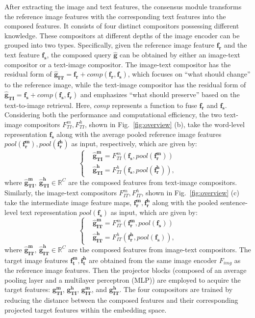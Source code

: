 \documentclass[sigconf]{acmart}
\begin{document}
After extracting the image and text features, the consensus module transforms the reference image features with the corresponding text features into the composed features. It consists of four distinct compositors possessing different knowledge. These compositors at different depths of the image encoder can be grouped into two types. Specifically, given the reference image feature $\bm{f_r}$ and the text feature $\bm{f_s}$, the composed query $\bm{\hat{g}}$ can be obtained by either an image-text compositor or a text-image compositor. The image-text compositor has the residual form of $\bm{\hat{g}_{IT}} = \bm{f_r} + comp(\bm{f_r},\bm{f_s})$, which focuses on ``what should change'' to the reference image, while the text-image compositor has the residual form of $\bm{\hat{g}_{TI}} = \bm{f_s} + comp(\bm{f_s},\bm{f_r})$ and emphasizes ``what should preserve'' based on the text-to-image retrieval. Here, $comp$ represents a function to fuse $\bm{f_r}$ and $\bm{f_s}$. Considering both the performance and computational efficiency, the two text-image compositors $F_{TI}^{m}, F_{TI}^{h}$, shown in Fig.~\ref{fig:overview} (b), take the word-level representation $\bm{f_s}$ along with the average pooled reference image features $pool(\bm{f^m_r}), pool(\bm{f^h_r})$ as input, respectively, which are given by:
\begin{equation}
\label{eq:text_comp}
    \begin{cases}
    &\bm{\hat{g}^m_{TI}} = F_{TI}^{m}(\bm{f_s}, pool(\bm{f^m_r})) \\
    &\bm{\hat{g}^h_{TI}} = F_{TI}^{h}(\bm{f_s}, pool(\bm{f^h_r})),
    \end{cases}
\end{equation}
where $\bm{\hat{g}^m_{TI}},~\bm{\hat{g}^h_{TI}}\in\mathbb{R}^C$ are the composed features from text-image compositors. Similarly, the image-text compositors $F_{IT}^m, F_{IT}^h$, shown in Fig.~\ref{fig:overview} (c) take the intermediate image feature maps, $\bm{f_r^m}, \bm{f_r^h}$ along with the pooled sentence-level text representation $pool(\bm{f_s})$ as input, which are given by:
\begin{equation}
\label{eq:img_comp}
    \begin{cases}
    &\bm{\hat{g}_{IT}^m} = F_{IT}^m(\bm{f^m_r}, pool(\bm{f_s})) \\
    &\bm{\hat{g}_{IT}^h} = F_{IT}^h(\bm{f^h_r}, pool(\bm{f_s})),
    \end{cases}
\end{equation}
where $\bm{\hat{g}_{IT}^m},~\bm{\hat{g}_{IT}^h} \in \mathbb{R}^C$ are the composed features from image-text compositors.
The target image features $\bm{f^m_t}, \bm{f^h_t}$ are obtained from the same image encoder $F_{img}$ as the reference image features. Then the projector blocks (composed of an average pooling layer and a multilayer perceptron (MLP)) are employed to acquire the target features: $\bm{g_{TI}^m}$, $\bm{g_{TI}^h}$, $\bm{g_{IT}^m}$, and $\bm{g_{IT}^h}$. The four compositors are trained by reducing the distance between the composed features and their corresponding projected target features within the embedding space.
\end{document}
